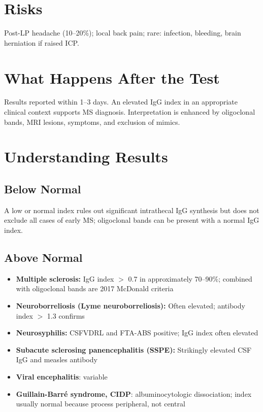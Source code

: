 \section*{Risks}
Post-LP headache (10--20\%); local back pain; rare: infection, bleeding, brain herniation if raised ICP.

\section*{What Happens After the Test}
Results reported within 1--3 days. An elevated IgG index in an appropriate clinical context supports MS diagnosis. Interpretation is enhanced by oligoclonal bands, MRI lesions, symptoms, and exclusion of mimics.

\section*{Understanding Results}

\subsection*{Below Normal}
A low or normal index rules out significant intrathecal IgG synthesis but does not exclude all cases of early MS; oligoclonal bands can be present with a normal IgG index.

\subsection*{Above Normal}
\begin{itemize}
  \item \textbf{Multiple sclerosis:} IgG index $>$ 0.7 in approximately 70--90\%; combined with oligoclonal bands are 2017 McDonald criteria
  \item \textbf{Neuroborreliosis (Lyme neuroborreliosis):} Often elevated; antibody index $>$ 1.3 confirms
  \item \textbf{Neurosyphilis:} CSFVDRL and FTA-ABS positive; IgG index often elevated
  \item \textbf{Subacute sclerosing panencephalitis (SSPE):} Strikingly elevated CSF IgG and measles antibody
  \item \textbf{Viral encephalitis}: variable
  \item \textbf{Guillain-Barré syndrome, CIDP}: albuminocytologic dissociation; index usually normal because process peripheral, not central
\end{itemize}

